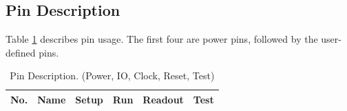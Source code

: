 \begin{landscape}
\section{Pin Description}
Table \ref{tab:pins} describes pin usage. The first four are power pins, followed by the user-defined pins.


\begin{savenotes}
\begin{table}[htbp]
 \caption{Pin Description. (Power, IO, Clock, Reset, Test)}
 \label{tab:pins}
 \centering\begin{tabular}{|r| p{3cm}|p{3cm} |p{3cm} |p{3cm}|p{3cm}|} \hline
No. & Name & Setup &Run & Readout & Test \\ \hline


\end{tabular}
\end{table}
\end{savenotes}
\end{landscape}

